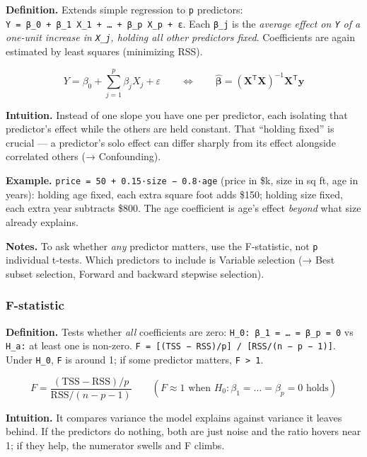 \documentclass[
  10pt,
  letterpaper,
  onecolumn]{article}
\begin{document}
\textbf{Definition.} Extends simple regression to \texttt{p} predictors:
\texttt{Y\ =\ β\_0\ +\ β\_1\ X\_1\ +\ …\ +\ β\_p\ X\_p\ +\ ε}. Each
\texttt{β\_j} is the \emph{average effect on \texttt{Y} of a one-unit
increase in \texttt{X\_j}, holding all other predictors fixed}.
Coefficients are again estimated by least squares (minimizing RSS).

\begin{equation*}
Y=\beta_0+\sum_{j=1}^{p}\beta_jX_j+\varepsilon
\qquad\Longleftrightarrow\qquad
\hat{\boldsymbol\beta}=(\mathbf{X}^{\mathsf T}\mathbf{X})^{-1}\mathbf{X}^{\mathsf T}\mathbf{y}
\end{equation*}

\textbf{Intuition.} Instead of one slope you have one per predictor,
each isolating that predictor's effect while the others are held
constant. That ``holding fixed'' is crucial --- a predictor's solo
effect can differ sharply from its effect alongside correlated others (→
Confounding).

\textbf{Example.} \texttt{price\ =\ 50\ +\ 0.15·size\ −\ 0.8·age} (price
in \$k, size in sq ft, age in years): holding age fixed, each extra
square foot adds \$150; holding size fixed, each extra year subtracts
\$800. The age coefficient is age's effect \emph{beyond} what size
already explains.

\textbf{Notes.} To ask whether \emph{any} predictor matters, use the
F-statistic, not \texttt{p} individual t-tests. Which predictors to
include is Variable selection (→ Best subset selection, Forward and
backward stepwise selection).

\hypertarget{f-statistic}{%
\subsubsection{F-statistic}\label{f-statistic}}

\textbf{Definition.} Tests whether \emph{all} coefficients are zero:
\texttt{H\_0:\ β\_1\ =\ …\ =\ β\_p\ =\ 0} vs \texttt{H\_a:} at least one
is non-zero.
\texttt{F\ =\ {[}(TSS\ −\ RSS)/p{]}\ /\ {[}RSS/(n\ −\ p\ −\ 1){]}}.
Under \texttt{H\_0}, \texttt{F} is around 1; if some predictor matters,
\texttt{F\ \textgreater{}\ 1}.

\begin{equation*}
F=\frac{(\mathrm{TSS}-\mathrm{RSS})/p}{\mathrm{RSS}/(n-p-1)}
\qquad (F\approx 1 \text{ when } H_0:\beta_1=\dots=\beta_p=0 \text{ holds})
\end{equation*}

\textbf{Intuition.} It compares variance the model explains against
variance it leaves behind. If the predictors do nothing, both are just
noise and the ratio hovers near 1; if they help, the numerator swells
and F climbs.
\end{document}
